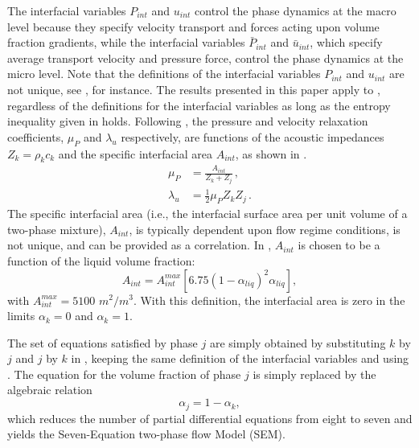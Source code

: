 %
The interfacial variables $P_{int}$ and $u_{int}$ control the phase dynamics at the macro level because they specify velocity transport
and forces acting upon volume fraction gradients, while the interfacial variables $\bar{P}_{int}$ and $\bar{u}_{int}$, which specify 
average transport velocity and pressure force, control the phase dynamics at the micro level.  Note that the definitions of the interfacial 
variables $P_{int}$ and 
$u_{int}$ are not unique, see \cite{BaerNunziato, GallouetHerardSeguin, Berry_2005}, for instance. 
The results presented in this paper apply to ,
regardless of the definitions for the interfacial variables as long as the entropy inequality given in  holds. 
Following \cite{SEM}, the pressure and velocity relaxation coefficients, $\mu_P$  and $\lambda_u$ respectively, are functions of the acoustic 
impedances $Z_k = \rho_k c_k$ and the specific interfacial area $A_{int}$, as shown in .
%
\begin{subequations}
\label{eq:relaxation_coeff}
\begin{align}
  \label{E-R:86}
  \mu_P &= \frac{A_{int}}{Z_{k}+Z_{j}}       \,,
  \\
  \label{E-R:85}
  \lambda_u &= \frac{1}{2} \mu_P Z_{k} Z_{j} \,.
\end{align}
\end{subequations}
%
The specific interfacial area (i.e., the interfacial surface area per unit volume of a two-phase mixture), $A_{int}$, is typically 
dependent upon flow regime conditions, is not unique, and can be provided as a correlation.
In \cite{SEM}, $A_{int}$ is chosen to be a function of the liquid volume fraction:
%
\begin{equation}\label{eq:Aint-sect4}
A_{int} = A_{int}^{max} \left[ 6.75 \left(1-\alpha_{liq} \right)^2 \alpha_{liq} \right],
\end{equation}
% 
with $A_{int}^{max} = 5100$ $m^2 / m^3$. With this definition, the interfacial area is zero in the limits $\alpha_{k} = 0$ and $\alpha_{k} = 1$.

The set of equations satisfied by phase $j$ are simply obtained by substituting $k$ by $j$ and $j$ by $k$ in , keeping 
the same definition of the interfacial variables and using . The equation for the volume fraction of phase $j$ is simply 
replaced by the algebraic relation
%
\begin{equation}
 \alpha_{j}= 1 - \alpha_{k}, 
\end{equation}
%
which reduces the number of partial differential equations from eight to seven and yields the Seven-Equation two-phase flow Model (SEM). 
%

